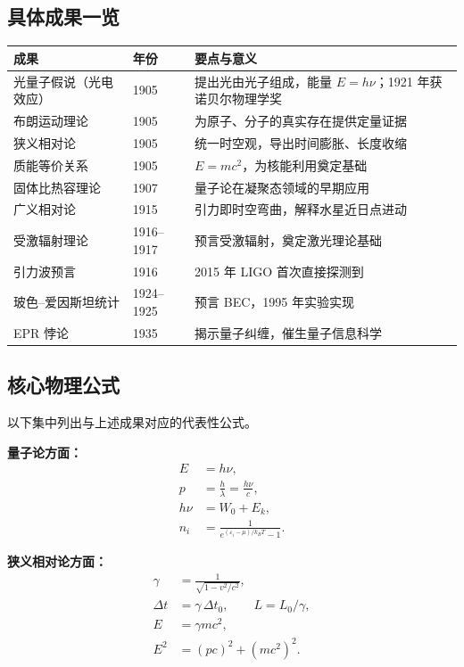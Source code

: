 \documentclass{ctexart} %
\begin{document}
\subsection*{具体成果一览}
\begin{center}
\begin{tabular}{@{}p{3.4cm}p{1.5cm}p{5.9cm}@{}}
\hline
\textbf{成果} & \textbf{年份} & \textbf{要点与意义} \\
\hline
光量子假说（光电效应） & 1905 & 提出光由光子组成，能量 $E = h\nu$；1921 年获诺贝尔物理学奖 \\
布朗运动理论 & 1905 & 为原子、分子的真实存在提供定量证据 \\
狭义相对论 & 1905 & 统一时空观，导出时间膨胀、长度收缩 \\
质能等价关系 & 1905 & $E = mc^2$，为核能利用奠定基础 \\
固体比热容理论 & 1907 & 量子论在凝聚态领域的早期应用 \\
广义相对论 & 1915 & 引力即时空弯曲，解释水星近日点进动 \\
受激辐射理论 & 1916--1917 & 预言受激辐射，奠定激光理论基础 \\
引力波预言 & 1916 & 2015 年 LIGO 首次直接探测到 \\
玻色--爱因斯坦统计 & 1924--1925 & 预言 BEC，1995 年实验实现 \\
EPR 悖论 & 1935 & 揭示量子纠缠，催生量子信息科学 \\
\hline
\end{tabular}
\end{center}

\subsection*{核心物理公式}
以下集中列出与上述成果对应的代表性公式。

\noindent\textbf{量子论方面：}
\begin{align}
    E &= h\nu, \label{eq:photon}\\
    p &= \frac{h}{\lambda} = \frac{h\nu}{c}, \label{eq:photonp}\\
    h\nu &= W_0 + E_k, \label{eq:pe}\\
    n_i &= \frac{1}{e^{(\varepsilon_i - \mu)/k_B T} - 1}. \label{eq:be}
\end{align}

\noindent\textbf{狭义相对论方面：}
\begin{align}
    \gamma &= \frac{1}{\sqrt{1 - v^2/c^2}}, \label{eq:gamma}\\
    \Delta t &= \gamma\,\Delta t_0, \qquad L = L_0 / \gamma, \label{eq:sr}\\
    E &= \gamma mc^2, \label{eq:e}\\
    E^2 &= (pc)^2 + (mc^2)^2. \label{eq:e2}
\end{align}
\end{document}
